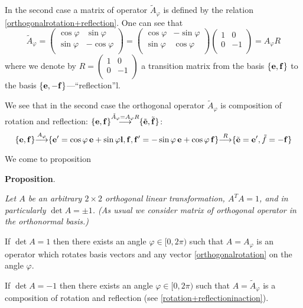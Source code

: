\documentclass[12pt]{article}
\numberwithin{equation}{section}
\begin{document}
 In the second case a matrix of operator
$\tilde A_\varphi$ is defined by the relation 
\eqref{orthogonalrotation+reflection}.
One can see that
                  \begin{equation}\label{secondcase-rotation}
    \tilde A_\varphi=\begin{pmatrix}
      \cos\varphi & \sin\varphi \\
      \sin\varphi & -\cos\varphi\\
       \end{pmatrix}=\begin{pmatrix}
      \cos\varphi & -\sin\varphi \\
      \sin\varphi & \cos\varphi\\
       \end{pmatrix}\begin{pmatrix}
      1 & 0 \\
      0 & -1\\
       \end{pmatrix}=A_\varphi R
\end{equation}
where we denote by $R=\begin{pmatrix}
      1 & 0 \\
      0 & -1\\
       \end{pmatrix}$ a transition matrix from the basis $\{{\bf e},{\bf f}\}$ to the basis $\{{\bf e},-{\bf f}\}$---``reflection''l.


       We see that in the second case the orthogonal  operator
  $\tilde A_\varphi$
is composition of rotation and reflection:
       $ \{\e,\f\}{\buildrel \tilde A_\varphi=A_\varphi R\over \longrightarrow}\{\tilde \e,\tilde \f\}$:
                           \begin{equation}\label{rotation+reflectioninaction}
    \{\e,\f\}{\buildrel A_\varphi\over \longrightarrow}
    \{\e'=\cos\varphi \,\e+\sin\varphi \l,\f,\f'=-\sin\varphi\, \e+\cos\varphi \,\f\}
    {\buildrel R\over \longrightarrow}\{\tilde \e=\e',\tilde f=-\f\}
\end{equation}


  We come to proposition

        \m

        {\bf Proposition}. {\it Let $A$ be an arbitrary 
$2\times 2$ orthogonal linear transformation, $A^TA=1$,
        and in particularly $\det A=\pm 1$. 
(As usual we consider matrix of orthogonal operator 
in the orthonormal basis.)

         If $\det A=1$
      then there exists an angle $\varphi\in [0,2\pi)$ such that
      $A=A_\varphi$ is an operator which rotates basis vectors
and any vector \eqref{orthogonalrotation}
     on the  angle  $\varphi$.

      If $\det A=-1$ then there exists an angle $\varphi\in [0,2\pi)$ 
such that $A=\tilde A_\varphi$
      is a composition of rotation and 
reflection (see \eqref{rotation+reflectioninaction}).}
\end{document}
